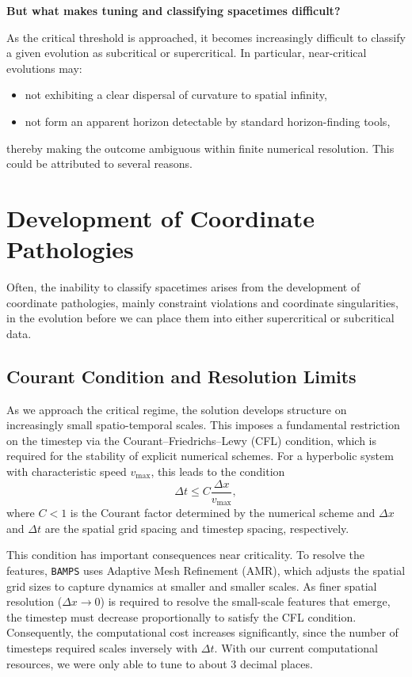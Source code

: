 \textbf{But what makes tuning and classifying spacetimes difficult?}

As the critical threshold is approached, it becomes increasingly difficult to classify a given evolution as subcritical or supercritical. In particular, near-critical evolutions may:
\begin{itemize}[nosep]
\item not exhibiting a clear dispersal of curvature to spatial infinity,
\item not form an apparent horizon detectable by standard horizon-finding tools,
\end{itemize}
thereby making the outcome ambiguous within finite numerical resolution. This could be attributed to several reasons.

\section*{Development of Coordinate Pathologies}

Often, the inability to classify spacetimes arises from the development of coordinate pathologies, mainly constraint violations and coordinate singularities, in the evolution before we can place them into either supercritical or subcritical data.


\subsection*{Courant Condition and Resolution Limits}

As we approach the critical regime, the solution develops structure on increasingly small spatio-temporal scales. This imposes a fundamental restriction on the timestep via the Courant–Friedrichs–Lewy (CFL) condition, which is required for the stability of explicit numerical schemes.
 For a hyperbolic system with characteristic speed $v_{\max}$, this leads to the condition
\[
\Delta t \leq C \frac{\Delta x}{v_{\max}},
\]
where $C < 1$ is the Courant factor determined by the numerical scheme and $\Delta x$ and $\Delta t$ are the spatial grid spacing and timestep spacing, respectively.


This condition has important consequences near criticality. To resolve the features, \texttt{BAMPS} uses Adaptive Mesh Refinement (AMR), which adjusts the spatial grid sizes to capture dynamics at smaller and smaller scales. As finer spatial resolution ($\Delta x \to 0$) is required to resolve the small-scale features that emerge, the timestep must decrease proportionally to satisfy the CFL condition. Consequently, the computational cost increases significantly, since the number of timesteps required scales inversely with $\Delta t$. With our current computational resources, we were only able to tune to about 3 decimal places.

